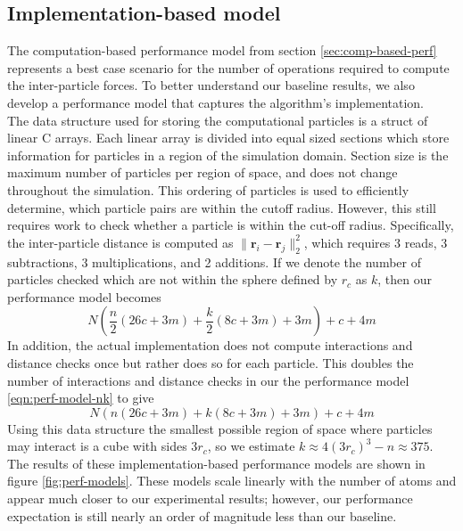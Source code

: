 \documentclass[12pt]{article}
\begin{document}
\subsection{Implementation-based model}
The computation-based performance model from section
\ref{sec:comp-based-perf} represents a best case scenario for the
number of operations required to compute the inter-particle forces.
To better understand our baseline results, we also develop a
performance model that captures the algorithm's implementation.
\\

The data structure used for storing the computational particles is a
struct of linear C arrays. Each linear array is divided into equal
sized sections which store information for particles in a region of
the simulation domain.  Section size is the maximum number of
particles per region of space, and does not change throughout the
simulation.  This ordering of particles is used to efficiently
determine, which particle pairs are within the cutoff radius.
However, this still requires work to check whether a particle is
within the cut-off radius. Specifically, the inter-particle distance
is computed as $\| \bm{r}_i - \bm{r}_j\|_2^2$, which requires 3 reads,
3 subtractions, 3 multiplications, and 2 additions.  If we denote the
number of particles checked which are not within the sphere defined by
$r_c$ as $k$, then our performance model becomes
\begin{equation}
  N \left(\frac{n}{2} \left(26 c + 3 m\right)+\frac{k}{2} \left(8 c + 3 m\right) + 3 m\right) + c + 4 m
  \label{eqn:perf-model-nk}
\end{equation}
In addition, the actual implementation does not compute interactions
and distance checks once but rather does so for each particle. This
doubles the number of interactions and distance checks in our the
performance model \ref{eqn:perf-model-nk} to give
\begin{equation}
  N \left(n \left(26 c + 3 m\right)+k \left(8 c + 3 m\right) + 3 m\right) + c + 4 m
  \label{eqn:perf-model-2n2k}
\end{equation}
Using this data structure the smallest possible region of space where
particles may interact is a cube with sides $3r_c$, so we estimate
$k\approx 4(3r_c)^3-n\approx 375$. The results of these
implementation-based performance models are shown in figure
\ref{fig:perf-models}. These models scale linearly with the number of
atoms and appear much closer to our experimental results; however, our
performance expectation is still nearly an order of magnitude less
than our baseline.
\end{document}
